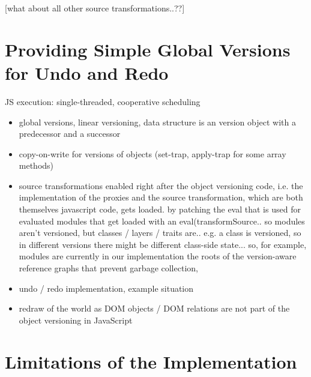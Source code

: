 [what about all other source transformations..??]




\section{Providing Simple Global Versions for Undo and Redo}

JS execution: single-threaded, cooperative scheduling 

\begin{itemize}
    \item global versions, linear versioning, data structure is an version object with a predecessor and a successor
    \item copy-on-write for versions of objects (set-trap, apply-trap for some array methods)
\end{itemize}


\begin{itemize}
    \item source transformations enabled right after the object versioning code, i.e. the implementation of the proxies and the source transformation, which are both themselves javascript code, gets loaded. by patching the eval that is used for evaluated modules that get loaded with an eval(transformSource.. so modules aren’t versioned, but classes / layers / traits are.. e.g. a class is versioned, so in different versions there might be different class-side state... so, for example, modules are currently in our implementation the roots of the version-aware reference graphs that prevent garbage collection, 
\end{itemize}


\begin{itemize}
    \item undo / redo implementation, example situation
    \item redraw of the world as DOM objects / DOM relations are not part of the object versioning in JavaScript
\end{itemize}






\section{Limitations of the Implementation}



